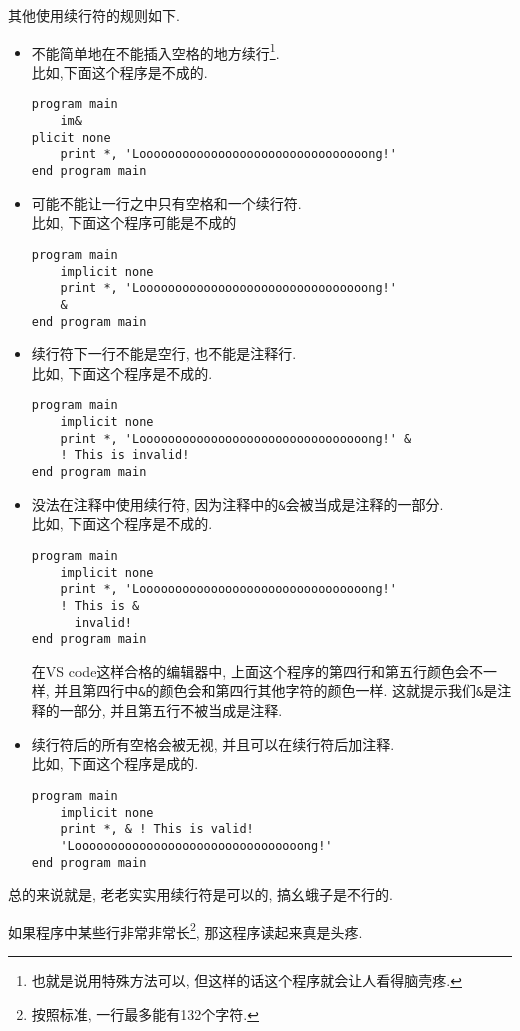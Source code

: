 其他使用续行符的规则如下.
\begin{itemize}
    \item 不能简单地在不能插入空格的地方续行\footnote{
        也就是说用特殊方法可以, 但这样的话这个程序就会让人看得脑壳疼.
    }.\\比如,下面这个程序是不成的.\begin{verbatim}
program main
    im&
plicit none
    print *, 'Loooooooooooooooooooooooooooooooong!'
end program main
    \end{verbatim}
    \item 可能不能让一行之中只有空格和一个续行符.\\比如, 下面这个程序可能是不成的    \begin{verbatim}
program main
    implicit none
    print *, 'Loooooooooooooooooooooooooooooooong!'
    &
end program main
    \end{verbatim}
    \item 续行符下一行不能是空行, 也不能是注释行.\\比如, 下面这个程序是不成的.\begin{verbatim}
program main
    implicit none
    print *, 'Loooooooooooooooooooooooooooooooong!' &
    ! This is invalid!
end program main
    \end{verbatim}
    \item 没法在注释中使用续行符, 因为注释中的\verb|&|会被当成是注释的一部分.\\比如, 下面这个程序是不成的.\begin{verbatim}
program main
    implicit none
    print *, 'Loooooooooooooooooooooooooooooooong!'
    ! This is &
      invalid!
end program main
    \end{verbatim}在VS code这样合格的编辑器中, 上面这个程序的第四行和第五行颜色会不一样, 并且第四行中\verb|&|的颜色会和第四行其他字符的颜色一样. 这就提示我们\verb|&|是注释的一部分, 并且第五行不被当成是注释.
    \item 续行符后的所有空格会被无视, 并且可以在续行符后加注释.\\比如, 下面这个程序是成的.\begin{verbatim}
program main
    implicit none
    print *, & ! This is valid!
    'Loooooooooooooooooooooooooooooooong!'
end program main
    \end{verbatim}
\end{itemize}

总的来说就是, 老老实实用续行符是可以的, 搞幺蛾子是不行的.

如果程序中某些行非常非常长\footnote{
    按照标准, 一行最多能有132个字符.
}, 那这程序读起来真是头疼.


